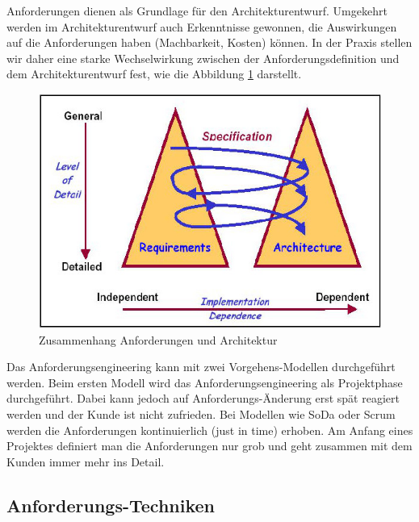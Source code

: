 Anforderungen dienen als Grundlage für den Architekturentwurf. Umgekehrt werden im Architekturentwurf auch
Erkenntnisse gewonnen, die Auswirkungen auf die Anforderungen haben (Machbarkeit, Kosten) können. In der Praxis stellen wir daher
eine starke Wechselwirkung zwischen der Anforderungsdefinition und dem Architekturentwurf fest, wie die Abbildung \ref{fig:anforderungsengineering} darstellt.
\begin{figure}
	\centering
	\includegraphics[width=0.7\linewidth]{fig/anforderungsengineering}
	\caption{Zusammenhang Anforderungen und Architektur}
	\label{fig:anforderungsengineering}
\end{figure}
Das Anforderungsengineering kann mit zwei Vorgehens-Modellen durchgeführt werden. Beim ersten Modell wird das Anforderungsengineering als Projektphase durchgeführt. Dabei kann jedoch auf Anforderungs-Änderung erst spät reagiert werden und der Kunde ist nicht zufrieden. Bei Modellen wie SoDa oder Scrum werden die Anforderungen kontinuierlich (just in time) erhoben. Am Anfang eines Projektes definiert man die Anforderungen nur grob und geht zusammen mit dem Kunden immer mehr ins Detail.

\subsection{Anforderungs-Techniken}

